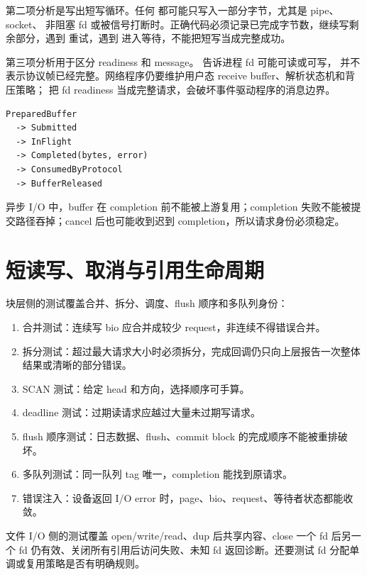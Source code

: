 第二项分析是写出短写循环。任何  都可能只写入一部分字节，尤其是 pipe、socket、
非阻塞 fd 或被信号打断时。正确代码必须记录已完成字节数，继续写剩余部分，遇到
 重试，遇到  进入等待，不能把短写当成完整成功。

第三项分析用于区分 readiness 和 message。 告诉进程 fd 可能可读或可写，
并不表示协议帧已经完整。网络程序仍要维护用户态 receive buffer、解析状态机和背压策略；
把 fd readiness 当成完整请求，会破坏事件驱动程序的消息边界。

\begin{lstlisting}
PreparedBuffer
  -> Submitted
  -> InFlight
  -> Completed(bytes, error)
  -> ConsumedByProtocol
  -> BufferReleased
\end{lstlisting}

异步 I/O 中，buffer 在 completion 前不能被上游复用；completion 失败不能被提交路径吞掉；cancel 后也可能收到迟到 completion，所以请求身份必须稳定。

\section{短读写、取消与引用生命周期}

块层侧的测试覆盖合并、拆分、调度、flush 顺序和多队列身份：

\begin{enumerate}
\tightlist
\item 合并测试：连续写 bio 应合并成较少 request，非连续不得错误合并。
\item 拆分测试：超过最大请求大小时必须拆分，完成回调仍只向上层报告一次整体结果或清晰的部分错误。
\item SCAN 测试：给定 head 和方向，选择顺序可手算。
\item deadline 测试：过期读请求应越过大量未过期写请求。
\item flush 顺序测试：日志数据、flush、commit block 的完成顺序不能被重排破坏。
\item 多队列测试：同一队列 tag 唯一，completion 能找到原请求。
\item 错误注入：设备返回 I/O error 时，page、bio、request、等待者状态都能收敛。
\end{enumerate}

文件 I/O 侧的测试覆盖 open/write/read、dup 后共享内容、close 一个 fd 后另一个 fd 仍有效、关闭所有引用后访问失败、未知 fd 返回诊断。还要测试 fd 分配单调或复用策略是否有明确规则。

